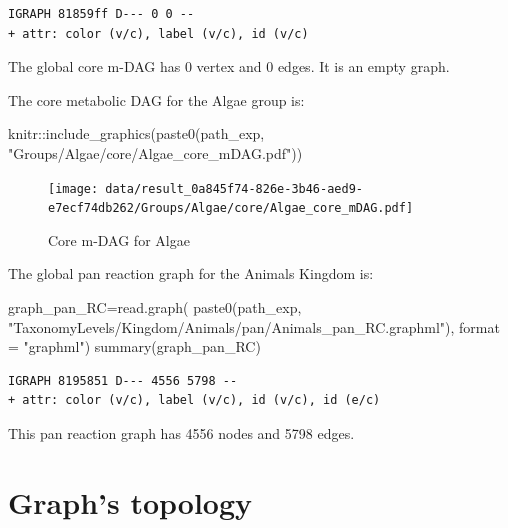 \documentclass[
  letterpaper,
  DIV=11,
  numbers=noendperiod]{scrreprt}
\newenvironment{Shaded}{}{}
\newcommand{\AttributeTok}[1]{\textcolor[rgb]{0.78,0.47,0.87}{#1}}
\newcommand{\FunctionTok}[1]{\textcolor[rgb]{0.38,0.69,0.94}{#1}}
\newcommand{\NormalTok}[1]{\textcolor[rgb]{0.67,0.70,0.75}{#1}}
\newcommand{\OtherTok}[1]{\textcolor[rgb]{0.15,0.68,0.38}{#1}}
\newcommand{\SpecialCharTok}[1]{\textcolor[rgb]{0.34,0.71,0.76}{#1}}
\newcommand{\StringTok}[1]{\textcolor[rgb]{0.60,0.76,0.47}{#1}}
\begin{document}
\begin{verbatim}
IGRAPH 81859ff D--- 0 0 -- 
+ attr: color (v/c), label (v/c), id (v/c)
\end{verbatim}

The global core m-DAG has 0 vertex and 0 edges. It is an empty graph.

The core metabolic DAG for the Algae group is:

\begin{Shaded}
\begin{Highlighting}[]
\NormalTok{knitr}\SpecialCharTok{::}\FunctionTok{include\_graphics}\NormalTok{(}\FunctionTok{paste0}\NormalTok{(path\_exp,                              }\StringTok{"Groups/Algae/core/Algae\_core\_mDAG.pdf"}\NormalTok{))}
\end{Highlighting}
\end{Shaded}

\begin{figure}[H]

{\centering \texttt{[image: data/result\_0a845f74-826e-3b46-aed9-e7ecf74db262/Groups/Algae/core/Algae\_core\_mDAG.pdf]}

}

\caption{Core m-DAG for Algae}

\end{figure}

The global pan reaction graph for the Animals Kingdom is:

\begin{Shaded}
\begin{Highlighting}[]
\NormalTok{graph\_pan\_RC}\OtherTok{=}\FunctionTok{read.graph}\NormalTok{(}
  \FunctionTok{paste0}\NormalTok{(path\_exp,}
         \StringTok{"TaxonomyLevels/Kingdom/Animals/pan/Animals\_pan\_RC.graphml"}\NormalTok{),}
  \AttributeTok{format =} \StringTok{"graphml"}\NormalTok{)}
\FunctionTok{summary}\NormalTok{(graph\_pan\_RC)}
\end{Highlighting}
\end{Shaded}

\begin{verbatim}
IGRAPH 8195851 D--- 4556 5798 -- 
+ attr: color (v/c), label (v/c), id (v/c), id (e/c)
\end{verbatim}

This pan reaction graph has 4556 nodes and 5798 edges.

\hypertarget{graphs-topology}{%
\section{Graph's topology}\label{graphs-topology}}
\end{document}
